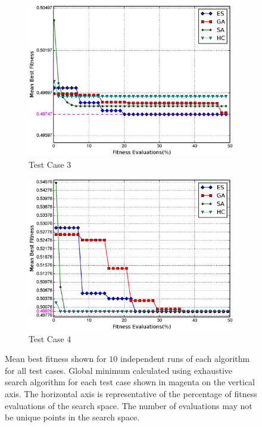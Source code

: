 \documentclass[conference]{IEEEtran}
\begin{document}
\begin{figure}
\begin{subfigure}{\columnwidth}
        \label{fig:tc2_mf}%
    \end{subfigure}\hfill\\
    \begin{subfigure}{\columnwidth}
        \includegraphics[width=\columnwidth]{FIG/tc3_mf.eps}%
        \caption{Test Case 3}%
        \label{fig:tc3_mf}%
    \end{subfigure}\hfill%
    \begin{subfigure}{\columnwidth}
        \includegraphics[width=\columnwidth]{FIG/tc4_mf.eps}%
        \caption{Test Case 4}%
        \label{fig:tc4_mf}%
    \end{subfigure}\hfill%
    \caption{Mean best fitness shown for $10$ independent runs of each algorithm for all test cases. Global minimum calculated using exhaustive search algorithm for each test case shown in magenta on the vertical axis. The horizontal axis is representative of the percentage of fitness evaluations of the search space. The number of evaluations may not be unique points in the search space.}
\label{fig:tc_mf}
\end{figure}
 
\end{document}
